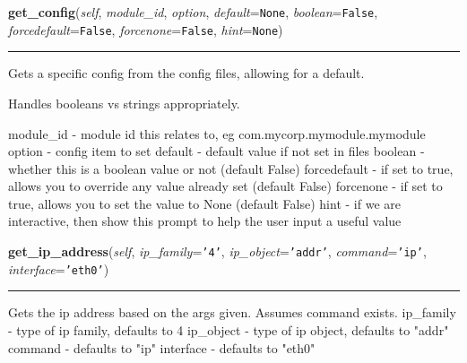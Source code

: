\hspace{.8\funcindent}\begin{boxedminipage}{\funcwidth}

    \raggedright \textbf{get\_config}(\textit{self}, \textit{module\_id}, \textit{option}, \textit{default}={\tt None}, \textit{boolean}={\tt False}, \textit{forcedefault}={\tt False}, \textit{forcenone}={\tt False}, \textit{hint}={\tt None})

    \vspace{-1.5ex}

    \rule{\textwidth}{0.5\fboxrule}
\setlength{\parskip}{2ex}
    Gets a specific config from the config files, allowing for a default.

    Handles booleans vs strings appropriately.

    module\_id    - module id this relates to, eg 
    com.mycorp.mymodule.mymodule option       - config item to set default
    - default value if not set in files boolean      - whether this is a 
    boolean value or not (default False) forcedefault - if set to true, 
    allows you to override any value already set (default False) forcenone
    - if set to true, allows you to set the value to None (default False) 
    hint         - if we are interactive, then show this prompt to help the
    user input a useful value

\setlength{\parskip}{1ex}
    \end{boxedminipage}

    \label{shutit_global:ShutIt:get_ip_address}

    \vspace{0.5ex}

\hspace{.8\funcindent}\begin{boxedminipage}{\funcwidth}

    \raggedright \textbf{get\_ip\_address}(\textit{self}, \textit{ip\_family}={\tt \texttt{'}\texttt{4}\texttt{'}}, \textit{ip\_object}={\tt \texttt{'}\texttt{addr}\texttt{'}}, \textit{command}={\tt \texttt{'}\texttt{ip}\texttt{'}}, \textit{interface}={\tt \texttt{'}\texttt{eth0}\texttt{'}})

    \vspace{-1.5ex}

    \rule{\textwidth}{0.5\fboxrule}
\setlength{\parskip}{2ex}
    Gets the ip address based on the args given. Assumes command exists. 
    ip\_family - type of ip family, defaults to 4 ip\_object - type of ip 
    object, defaults to "addr" command   - defaults to "ip" interface - 
    defaults to "eth0"

\setlength{\parskip}{1ex}
    \end{boxedminipage}

